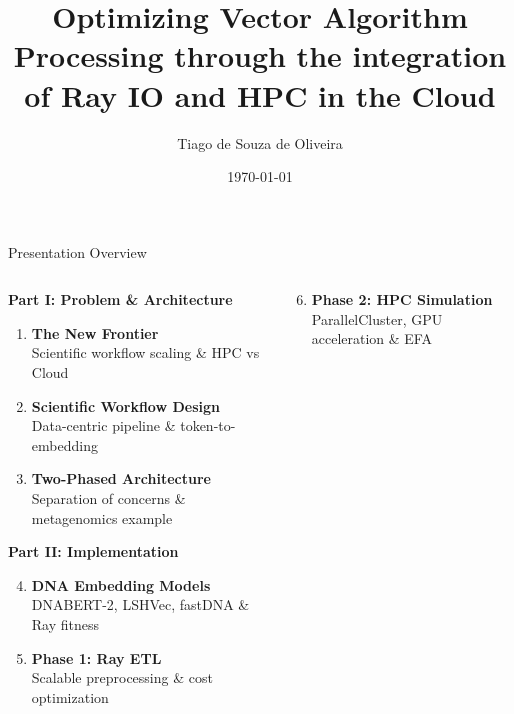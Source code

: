\documentclass[aspectratio=169]{beamer}
\title[Optimizing Vector Algorithm Processing]{Optimizing Vector Algorithm Processing through the integration of Ray IO and HPC in the Cloud}
\author{Tiago de Souza de Oliveira}
\institute[University]{
    Master's Thesis Defense \\
    Computer Science Department
}
\date{\today}
\begin{document}
\frame{\titlepage}

\begin{frame}{Presentation Overview}
    \begin{columns}
        \begin{column}{0.48\textwidth}
            \textbf{\textcolor{rayblue}{Part I: Problem \& Architecture}}
            \begin{enumerate}
                \item \textbf{The New Frontier} \\
                \small Scientific workflow scaling \& HPC vs Cloud
                
                \item \textbf{Scientific Workflow Design} \\
                \small Data-centric pipeline \& token-to-embedding
                
                \item \textbf{Two-Phased Architecture} \\
                \small Separation of concerns \& metagenomics example
            \end{enumerate}
            
            \vspace{0.4cm}
            \textbf{\textcolor{hpcgreen}{Part II: Implementation}}
            \begin{enumerate}
                \setcounter{enumi}{3}
                \item \textbf{DNA Embedding Models} \\
                \small DNABERT-2, LSHVec, fastDNA \& Ray fitness
                
                \item \textbf{Phase 1: Ray ETL} \\
                \small Scalable preprocessing \& cost optimization
            \end{enumerate}
        \end{column}
        
        \begin{column}{0.48\textwidth}
            \begin{enumerate}
                \setcounter{enumi}{5}
                \item \textbf{Phase 2: HPC Simulation} \\
                \small ParallelCluster, GPU acceleration \& EFA
            \end{enumerate}
            

\end{column}
\end{columns}
\end{frame}
\end{document}
